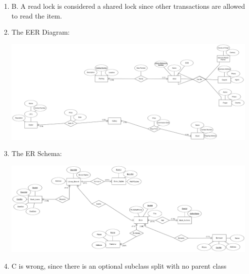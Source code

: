 \documentclass[12pt]{article}
\begin{document}
\begin{enumerate}
	\item B. A read lock is considered a shared lock since other transactions are allowed to read the item.
	
	\item The EER Diagram: \\
	\begin{center}
			\includegraphics[scale=.06]{40}
	\end{center} 
	
	\pagebreak
	
	\item The ER Schema: \\
	\begin{center}
			\includegraphics[scale=.07]{41}
	\end{center} 
	
	\item C is wrong, since there is an optional subclass split with no parent class
	

\end{enumerate}
\end{document}
